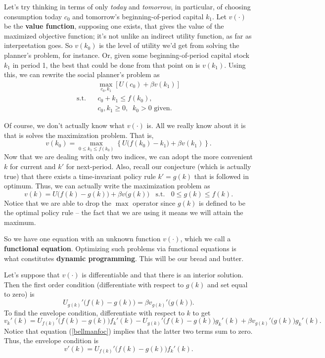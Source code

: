 \documentclass[12pt]{article}
\theoremstyle{definition}
\begin{document}
Let's try thinking in terms of only \emph{today} and \emph{tomorrow}, in particular, of choosing consumption today $c_0$ and tomorrow's beginning-of-period capital $k_1$. Let $v(\cdot)$ be the \textbf{value function}, supposing one exists, that gives the value of the maximized objective function; it's not unlike an indirect utility function, as far as interpretation goes. So $v(k_0)$ is the level of utility we'd get from solving the planner's problem, for instance. Or, given some beginning-of-period capital stock $k_1$ in period 1, the best that could be done from that point on is $v(k_1)$. Using this, we can rewrite the social planner's problem as 
\begin{align*}
	&\max_{c_0, k_1} \left[U(c_0) + \beta v(k_1) \right]\\
	\text{s.t. }\;\; &c_0 + k_1 \leq f(k_0),\\
	&c_0, k_1 \geq 0, \;\; k_0>0 \text{ given}.
\end{align*}

Of course, we don't actually know what $v(\cdot)$ is. All we really know about it is that is solves the maximization problem. That is,
	\[v(k_0) = \max_{0 \leq k_1 \leq f(k_0)} \left \{ U\big( f(k_0) - k_1 \big) + \beta v(k_1) \right \}.	\]
Now that we are dealing with only two indices, we can adopt the more convenient $k$ for current and $k'$ for next-period. Also, recall our conjecture (which is actually true) that there exists a time-invariant policy rule $k'=g(k)$ that is followed in optimum. Thus, we can actually write the maximization problem as 
	\[v(k) = U\big( f(k) - g(k) \big) + \beta v\big( g(k) \big)  \; \; \text{ s.t. } \;\; 0 \leq g(k) \leq f(k) .	\]
Notice that we are able to drop the $\max$ operator since $g(k)$ is defined to be the optimal policy rule -- the fact that we are using it means we will attain the maximum.

So we have one equation with an unknown function $v(\cdot)$, which we call a \textbf{functional equation}. Optimizing such problems via functional equations is what constitutes \textbf{dynamic programming}. This will be our bread and butter. 

Let's suppose that $v(\cdot)$ is differentiable and that there is an interior solution. Then the first order condition (differentiate with respect to $g(k)$ and set equal to zero) is
\begin{equation}
	U_{g(k)}'\big( f(k) - g(k) \big) = \beta v_{g(k)}'\big( g(k) \big). \label{bellmanfoc}
\end{equation}
To find the envelope condition, differentiate with respect to $k$ to get
\[
	v_{k}'(k) = U_{f(k)}'\big( f(k)-g(k)\big)f_k'(k) - U_{g(k)}'\big( f(k)-g(k)\big)g_k'(k) + \beta v_{g(k)}'\big(g(k)\big)g_k'(k).
\]
Notice that equation (\ref{bellmanfoc}) implies that the latter two terms sum to zero. Thus, the envelope condition is
\begin{equation}
	v'(k)=U_{f(k)}'\big( f(k)-g(k)\big)f_k'(k).
\end{equation}
\end{document}
